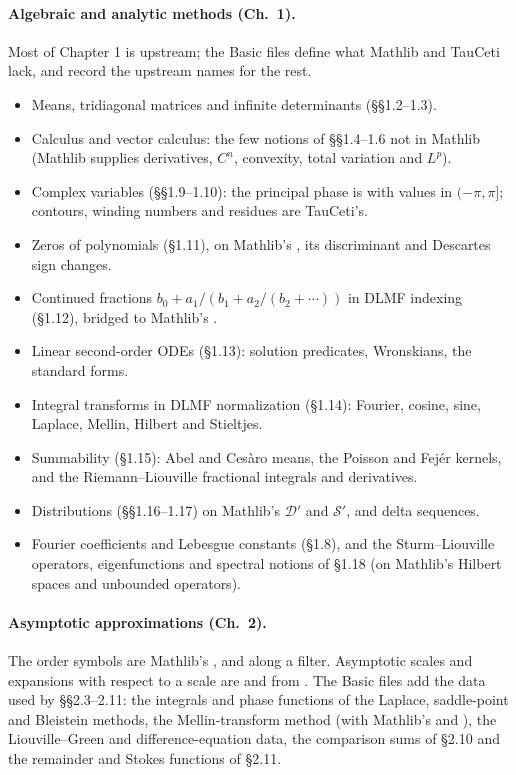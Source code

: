 \documentclass[11pt,a4paper]{article}
\begin{document}
\paragraph{Algebraic and analytic methods (Ch.~1).} Most of Chapter 1 is upstream; the Basic
files define what Mathlib and TauCeti lack, and record the upstream names for the rest.
\begin{itemize}
  \item Means, tridiagonal matrices and infinite determinants (\S\S1.2--1.3).
  \item Calculus and vector calculus: the few notions of \S\S1.4--1.6 not in Mathlib
    (Mathlib supplies derivatives, $C^n$, convexity, total variation and $L^p$).
  \item Complex variables (\S\S1.9--1.10): the principal phase is  with
    values in $(-\pi,\pi]$; contours, winding numbers and residues are TauCeti's.
  \item Zeros of polynomials (\S1.11), on Mathlib's , its discriminant and
    Descartes sign changes.
  \item Continued fractions $b_0+a_1/(b_1+a_2/(b_2+\cdots))$ in DLMF indexing (\S1.12),
    bridged to Mathlib's .
  \item Linear second-order ODEs (\S1.13): solution predicates, Wronskians, the standard
    forms.
  \item Integral transforms in DLMF normalization (\S1.14): Fourier, cosine, sine, Laplace,
    Mellin, Hilbert and Stieltjes.
  \item Summability (\S1.15): Abel and Ces\`aro means, the Poisson and Fej\'er kernels, and
    the Riemann--Liouville fractional integrals and derivatives.
  \item Distributions (\S\S1.16--1.17) on Mathlib's $\mathcal D'$ and $\mathcal S'$, and delta
    sequences.
  \item Fourier coefficients and Lebesgue constants (\S1.8), and the Sturm--Liouville
    operators, eigenfunctions and spectral notions of \S1.18 (on Mathlib's Hilbert spaces and
    unbounded operators).
\end{itemize}

\paragraph{Asymptotic approximations (Ch.~2).} The order symbols are Mathlib's
,  and  along a filter. Asymptotic scales and
expansions with respect to a scale are  and
 from . The Basic files add the
data used by \S\S2.3--2.11: the integrals and phase functions of the Laplace, saddle-point and
Bleistein methods, the Mellin-transform method (with Mathlib's  and
), the Liouville--Green and difference-equation data, the comparison sums of
\S2.10 and the remainder and Stokes functions of \S2.11.
\end{document}
